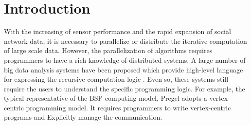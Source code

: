 \section{Introduction}
With the increasing of sensor performance and the rapid expansion of social network data, it is necessary to parallelize or distribute the iterative computation of large scale data. However, the parallelization of algorithms requires programmers to have a rich knowledge of distributed systems. A large number of big data analysis systems have been proposed which provide high-level language for expressing the recursive computation logic \cite{Dean:2004:MSD:1251254.1251264,giraph,maiter,Fan:2017:PSG:3035918.3035942,Malewicz2010Pregel,DBLP:journals/corr/GonzalezBJFHGS15,8017445,Low:2012:DGF:2212351.2212354,Han:2015:GUB:2777598.2777604,grace}. Even so, these systems still require the users to understand the specific programming logic. For example, the typical representative of the BSP computing model, Pregel \cite{Malewicz2010Pregel} adopts a vertex-centric programming model. It requires programmers to write vertex-centric programs and Explicitly manage the communication.
